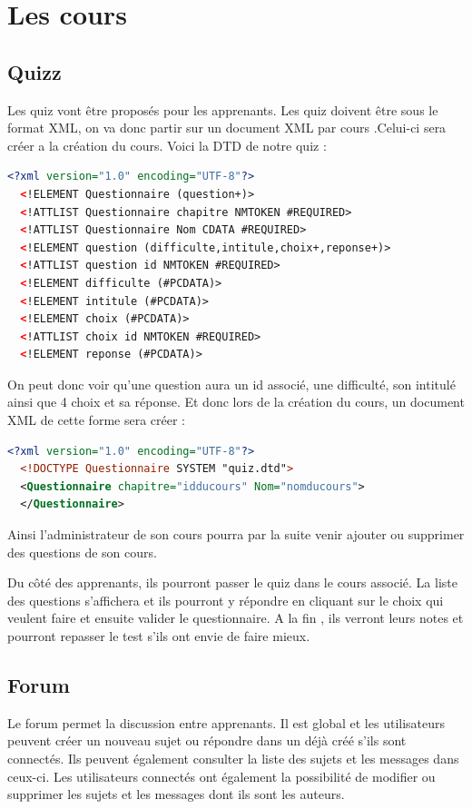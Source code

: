 \documentclass[a4paper,10pt]{article}
\begin{document}
\section{Les cours}
\subsection{Quizz}
Les quiz vont être proposés pour les apprenants. Les quiz doivent être sous le format XML, on va donc partir sur un document XML par cours .Celui-ci sera créer a la création du cours.
Voici la DTD de notre quiz : 
\begin{lstlisting}[language=XML]
  <?xml version="1.0" encoding="UTF-8"?>
  <!ELEMENT Questionnaire (question+)>
  <!ATTLIST Questionnaire chapitre NMTOKEN #REQUIRED>
  <!ATTLIST Questionnaire Nom CDATA #REQUIRED>
  <!ELEMENT question (difficulte,intitule,choix+,reponse+)>
  <!ATTLIST question id NMTOKEN #REQUIRED>
  <!ELEMENT difficulte (#PCDATA)>
  <!ELEMENT intitule (#PCDATA)>
  <!ELEMENT choix (#PCDATA)>
  <!ATTLIST choix id NMTOKEN #REQUIRED>
  <!ELEMENT reponse (#PCDATA)>
\end{lstlisting}
On peut donc voir qu'une question aura un id associé, une difficulté, son intitulé ainsi que 4 choix et sa réponse.
Et donc lors de la création du cours, un document XML de cette forme sera créer : 
\begin{lstlisting}[language=XML]
  <?xml version="1.0" encoding="UTF-8"?>
  <!DOCTYPE Questionnaire SYSTEM "quiz.dtd">
  <Questionnaire chapitre="idducours" Nom="nomducours"> 
  </Questionnaire>
\end{lstlisting} 

Ainsi l'administrateur de son cours pourra par la suite venir ajouter ou supprimer des questions de son cours. 

Du côté des apprenants, ils pourront passer le quiz dans le cours associé. La liste des questions s'affichera et ils pourront y répondre en cliquant sur le choix qui veulent faire et ensuite valider le questionnaire.
A la fin , ils verront leurs notes et pourront repasser le test s'ils ont envie de faire mieux.
\subsection{Forum}
Le forum permet la discussion entre apprenants. Il est global et les utilisateurs peuvent créer un nouveau sujet ou répondre dans un déjà créé s'ils sont connectés. Ils peuvent également consulter la liste des sujets et les messages dans ceux-ci. Les utilisateurs connectés ont également la possibilité de modifier ou supprimer les sujets et les messages dont ils sont les auteurs. 
\end{document}
